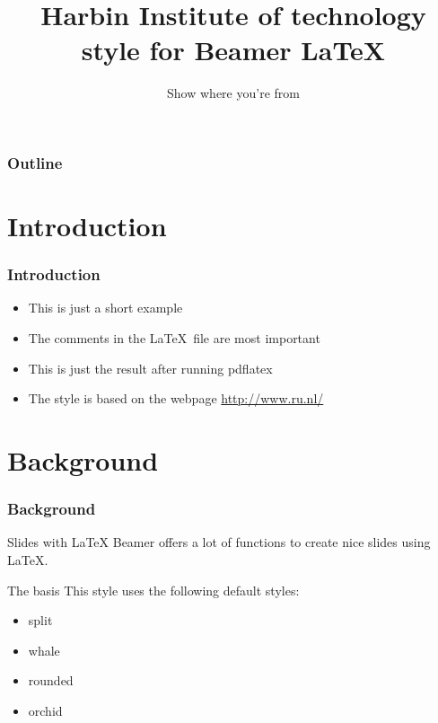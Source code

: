 \documentclass{beamer}
\title[HIT style for Beamer]{
  Harbin Institute of technology style for Beamer \LaTeX}
\subtitle{Show where you're from}
\author[Junjie Wang]{}
\institute[Harbin Institute of technology]{
  Institute for Computer and  Sciences -- Aerospace Software  Engineering }
\date{}
\begin{document}
\begin{CJK}{UTF8}{gbsn}

\begin{frame}[plain]
  \titlepage
\end{frame}

\begin{frame}
  \frametitle{Outline}

  \tableofcontents
\end{frame}

\section{Introduction}

\begin{frame}
  \frametitle{Introduction}

  \begin{itemize}
    \item This is just a short example
    \item The comments in the \LaTeX\ file are most important
    \item This is just the result after running pdflatex
    \item The style is based on the webpage \url{http://www.ru.nl/}
  \end{itemize}
\end{frame}

\section{Background}

\begin{frame}
  \frametitle{Background}

  \begin{block}{Slides with \LaTeX}
    Beamer offers a lot of functions to create nice slides using \LaTeX.
  \end{block}

  \begin{block}{The basis}
    This style uses the following default styles:
    \begin{itemize}
      \item split
      \item whale
      \item rounded
      \item orchid
    \end{itemize}
  \end{block}
\end{frame}


\end{CJK}
\end{document}
